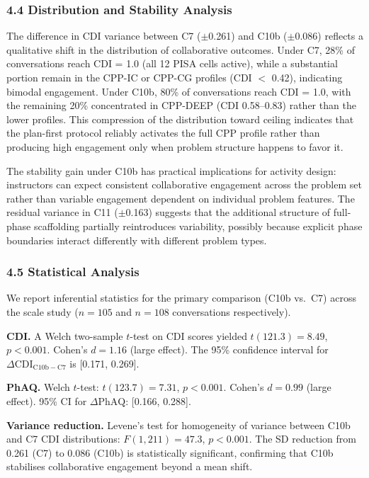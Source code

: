 \documentclass[
  11pt,
]{article}
\begin{document}
\subsubsection{4.4 Distribution and Stability
Analysis}\label{distribution-and-stability-analysis}

The difference in CDI variance between C7 ($\pm$0.261) and C10b ($\pm$0.086) reflects a qualitative shift in the distribution of collaborative outcomes. Under C7, 28\% of conversations reach CDI = 1.0 (all 12 PISA cells active), while a substantial portion remain in the CPP-IC or CPP-CG profiles (CDI $<$ 0.42), indicating bimodal engagement. Under C10b, 80\% of conversations reach CDI = 1.0, with the remaining 20\% concentrated in CPP-DEEP (CDI 0.58--0.83) rather than the lower profiles. This compression of the distribution toward ceiling indicates that the plan-first protocol reliably activates the full CPP profile rather than producing high engagement only when problem structure happens to favor it.

The stability gain under C10b has practical implications for activity design: instructors can expect consistent collaborative engagement across the problem set rather than variable engagement dependent on individual problem features. The residual variance in C11 ($\pm$0.163) suggests that the additional structure of full-phase scaffolding partially reintroduces variability, possibly because explicit phase boundaries interact differently with different problem types.

\subsubsection{4.5 Statistical Analysis}\label{statistical-analysis}

We report inferential statistics for the primary comparison (C10b vs.\ C7) across the scale study ($n = 105$ and $n = 108$ conversations respectively).

\textbf{CDI.} A Welch two-sample $t$-test on CDI scores yielded $t(121.3) = 8.49$, $p < 0.001$. Cohen's $d = 1.16$ (large effect). The 95\% confidence interval for $\Delta\mathrm{CDI}_{\mathrm{C10b-C7}}$ is [0.171, 0.269].

\textbf{PhAQ.} Welch $t$-test: $t(123.7) = 7.31$, $p < 0.001$. Cohen's $d = 0.99$ (large effect). 95\% CI for $\Delta\mathrm{PhAQ}$: [0.166, 0.288].

\textbf{Variance reduction.} Levene's test for homogeneity of variance between C10b and C7 CDI distributions: $F(1, 211) = 47.3$, $p < 0.001$. The SD reduction from 0.261 (C7) to 0.086 (C10b) is statistically significant, confirming that C10b stabilises collaborative engagement beyond a mean shift.
\end{document}
